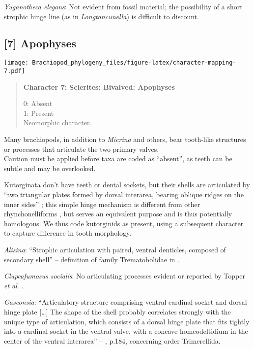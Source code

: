 \documentclass[openany]{book}
\theoremstyle{definition}
\theoremstyle{definition}
\theoremstyle{definition}
\theoremstyle{remark}
\begin{document}
\hypertarget{Yuganotheca_elegans-coding-6}{}
\emph{Yuganotheca elegans}: Not evident from fossil material; the
possibility of a short strophic hinge line (as in \emph{Longtancunella})
is difficult to discount.

\subsection*{{[}7{]} Apophyses}\label{apophyses}

\texttt{[image: Brachiopod\_phylogeny\_files/figure-latex/character-mapping-7.pdf]}

\begin{quote}
\textbf{Character 7: Sclerites: Bivalved: Apophyses}

0: Absent\\
1: Present\\
Neomorphic character.
\end{quote}

Many brachiopods, in addition to \emph{Micrina} and others, bear
tooth-like structures or processes that articulate the two primary
valves.\\
Caution must be applied before taxa are coded as ``absent'', as teeth
can be subtle and may be overlooked.

Kutorginata don't have teeth or dental sockets, but their shells are
articulated by ``two triangular plates formed by dorsal interarea,
bearing oblique ridges on the inner sides''
\citep[p.~211]{Williams2000LinguliformeaCraniiformea}; this simple hinge
mechanism is different from other rhynchonelliforms
\citep[p.208]{Williams2000LinguliformeaCraniiformea}, but serves an
equivalent purpose and is thus potentially homologous. We thus code
kutorginids as present, using a subsequent character to capture
difference in tooth morphology.

\hypertarget{Alisina-coding-7}{}
\emph{Alisina}: ``Strophic articulation with paired, ventral denticles,
composed of secondary shell'' -- definition of family Trematobolidae in
\citet{Williams2000LinguliformeaCraniiformea}.

\hypertarget{Clupeafumosus_socialis-coding-7}{}
\emph{Clupeafumosus socialis}: No articulating processes evident or
reported by Topper \emph{et al}. \citeyearpar{Topper2013Reappraisalof}.

\hypertarget{Gasconsia-coding-7}{}
\emph{Gasconsia}: ``Articulatory structure comprising ventral cardinal
socket and dorsal hinge plate {[}\ldots{}{]} The shape of the shell
probably correlates strongly with the unique type of articulation, which
consists of a dorsal hinge plate that fits tightly into a cardinal
socket in the ventral valve, with a concave homeodeltidium in the center
of the ventral interarea'' --
\citet{Williams2000LinguliformeaCraniiformea}, p.184, concerning order
Trimerellida.
\end{document}
